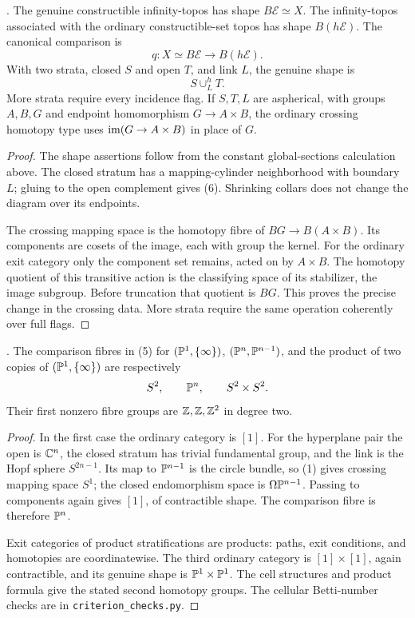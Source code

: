 \begin{theorem}\label{P1d1}
.
The genuine constructible infinity-topos has shape
$B\mathcal E\simeq X$. The infinity-topos associated
with the ordinary constructible-set topos has shape
$B(h\mathcal E)$. The canonical comparison is
\[
            q:X\simeq B\mathcal E\longrightarrow B(h\mathcal E). \tag{5}
\]
With two strata, closed $S$ and open $T$, and link $L$,
the genuine shape is
\[
                              S\cup_L^hT. \tag{6}
\]
More strata require every incidence flag.
If $S,T,L$ are aspherical, with groups $A,B,G$
and endpoint homomorphism $G\to A\times B$,
the ordinary crossing homotopy type uses
$\operatorname{im}(G\to A\times B)$ in place of $G$.
\end{theorem}
\begin{proof}
The shape assertions follow from the constant
global-sections calculation above. The closed
stratum has a mapping-cylinder neighborhood with
boundary $L$; gluing to the open complement
gives (6). Shrinking collars does not change
the diagram over its endpoints.

The crossing mapping space is the homotopy
fibre of $BG\to B(A\times B)$. Its components
are cosets of the image, each with group
the kernel. For the ordinary exit category
only the component set remains, acted on
by $A\times B$. The homotopy quotient of
this transitive action is the classifying
space of its stabilizer, the image subgroup.
Before truncation that quotient is $BG$.
This proves the precise change in the
crossing data. More strata require the
same operation coherently over full flags.
\end{proof}

\begin{proposition}\label{P1d2}
.
The comparison fibres in (5) for
$(\mathbb P^1,\{\infty\})$, $(\mathbb P^n,\mathbb P^{n-1})$,
and the product of two copies of
$(\mathbb P^1,\{\infty\})$ are respectively
\[
                    S^2,\qquad\mathbb P^n,\qquad S^2\times S^2 .
\]
Their first nonzero fibre groups are $\mathbb Z,\mathbb Z,\mathbb Z^2$
in degree two.
\end{proposition}
\begin{proof}
In the first case the ordinary category is $[1]$.
For the hyperplane pair the open is $\mathbb C^n$,
the closed stratum has trivial fundamental group,
and the link is the Hopf sphere $S^{2n-1}$.
Its map to $\mathbb P^{n-1}$ is the circle bundle,
so (1) gives crossing mapping space $S^1$;
the closed endomorphism space is
$\Omega\mathbb P^{n-1}$. Passing to components
again gives $[1]$, of contractible shape.
The comparison fibre is therefore $\mathbb P^n$.

Exit categories of product stratifications
are products: paths, exit conditions, and
homotopies are coordinatewise. The third
ordinary category is $[1]\times[1]$,
again contractible, and its genuine shape
is $\mathbb P^1\times\mathbb P^1$.
The cell structures and product formula
give the stated second homotopy groups.
The cellular Betti-number checks are in
\texttt{criterion\_checks.py}.
\end{proof}

